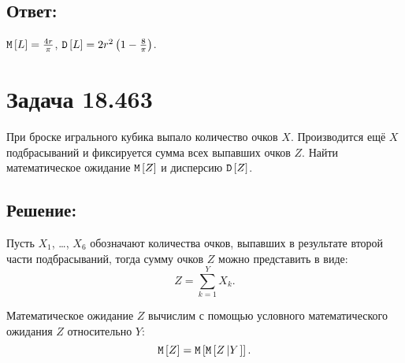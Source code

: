 \subsection*{Ответ:}
$\mathtt{M} \left [ L \right ] = \frac{4 r}{\pi}$, $\mathtt{D} \left [ L \right ] = 2 r^2 \left ( 1 - \frac{8}{\pi} \right )$.

\section*{Задача 18.463}
При броске игрального кубика выпало количество очков $X$. Производится ещё $X$ подбрасываний и фиксируется сумма всех выпавших очков $Z$.
Найти математическое ожидание $\mathtt{M} \left [ Z \right ]$ и дисперсию $\mathtt{D} \left [ Z \right ]$.

\subsection*{Решение:}
Пусть $X_1$, \dots, $X_6$ обозначают количества очков, выпавших в результате второй части подбрасываний, тогда сумму очков $Z$ можно представить
в виде:
\begin{equation}
    Z
    = \sum_{k=1}^Y X_k .
\end{equation}

Математическое ожидание $Z$ вычислим с помощью условного математического ожидания $Z$ относительно $Y$:
\begin{equation}
    \mathtt{M} \left [ Z \right ]
    = \mathtt{M} \left [ \mathtt{M} \left [ Z \left | Y \right . \right ] \right ].
\end{equation}

